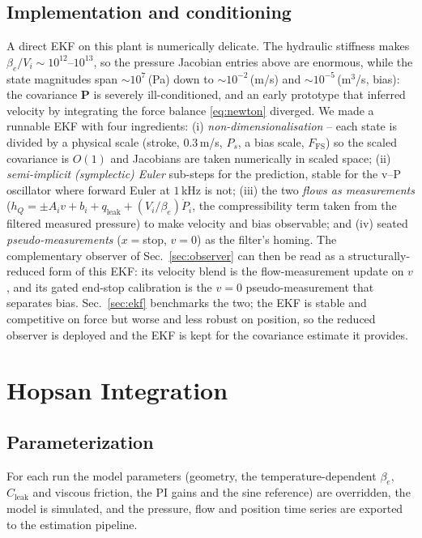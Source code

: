 \subsection{Implementation and conditioning}
A direct EKF on this plant is numerically delicate. The hydraulic stiffness makes
$\beta_e/V_i \sim 10^{12}$--$10^{13}$, so the pressure Jacobian entries above are
enormous, while the state magnitudes span $\sim\!10^{7}$\,(Pa) down to
$\sim\!10^{-2}$\,(m/s) and $\sim\!10^{-5}$\,(m$^3$/s, bias): the covariance
$\mathbf P$ is severely ill-conditioned, and an early prototype that inferred
velocity by integrating the force balance \eqref{eq:newton} diverged. We made a
runnable EKF with four ingredients: (i) \emph{non-dimensionalisation} -- each
state is divided by a physical scale (stroke, $0.3$\,m/s, $P_s$, a bias scale,
$F_{\text{FS}}$) so the scaled covariance is $O(1)$ and Jacobians are taken
numerically in scaled space; (ii) \emph{semi-implicit (symplectic) Euler}
sub-steps for the prediction, stable for the v--P oscillator where forward Euler
at $1$\,kHz is not; (iii) the two \emph{flows as measurements}
($h_Q=\pm A_i v + b_i + q_{\text{leak}} + (V_i/\beta_e)\dot P_i$, the
compressibility term taken from the filtered measured pressure) to make velocity
and bias observable; and (iv) seated \emph{pseudo-measurements} ($x{=}$stop,
$v{=}0$) as the filter's homing. The complementary observer of
Sec.~\ref{sec:observer} can then be read as a structurally-reduced form of this
EKF: its velocity blend is the flow-measurement update on $v$, and its gated
end-stop calibration is the $v{=}0$ pseudo-measurement that separates bias.
Sec.~\ref{sec:ekf} benchmarks the two; the EKF is stable and competitive on force
but worse and less robust on position, so the reduced observer is deployed and
the EKF is kept for the covariance estimate it provides.

\section{Hopsan Integration}\label{app:hopsan}
\subsection{Parameterization}
For each run the model parameters (geometry, the temperature-dependent
$\beta_e$, $C_{\text{leak}}$ and viscous friction, the PI gains and the sine
reference) are overridden, the model is simulated, and the pressure, flow and
position time series are exported to the estimation pipeline.

